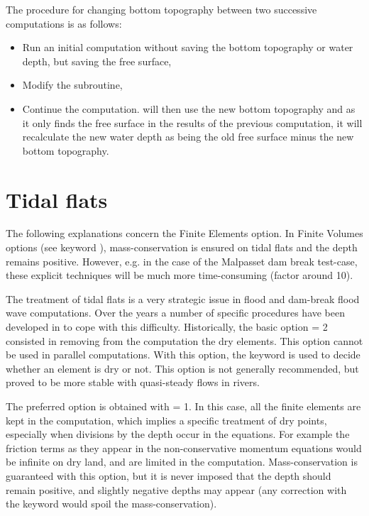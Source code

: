 The procedure for changing bottom topography between two successive computations
is as follows:
\begin{itemize}
\item Run an initial computation without saving the bottom topography or water
depth, but saving the free surface,

\item Modify the  subroutine,

\item Continue the computation.
 will then use the new bottom topography and as it only finds the
free surface in the results of the previous computation, it will recalculate the
new water depth as being the old free surface minus the new bottom topography.

\end{itemize}


\section{Tidal flats}

The following explanations concern the Finite Elements option.
In Finite Volumes options (see keyword ), mass-conservation is
ensured on tidal flats and the depth remains positive.
However, e.g. in the case of the Malpasset dam break test-case, these explicit
techniques will be much more time-consuming (factor around 10).

The treatment of tidal flats is a very strategic issue in flood and dam-break
flood wave computations.
Over the years a number of specific procedures have been developed in
 to cope with this difficulty.
Historically, the basic option  = 2
consisted in removing from the computation the dry elements.
This option cannot be used in parallel computations.
With this option, the keyword  is used to decide
whether an element is dry or not.
This option is not generally recommended, but proved to be more stable with
quasi-steady flows in rivers.

The preferred option is obtained with  = 1.
In this case, all the finite elements are kept in the computation,
which implies a specific treatment of dry points, especially when divisions
by the depth occur in the equations.
For example the friction terms as they appear in the non-conservative momentum
equations would be infinite on dry land, and are limited in the computation.
Mass-conservation is guaranteed with this option, but it is never imposed
that the depth should remain positive, and slightly negative depths may appear
(any correction with the keyword  would spoil the
mass-conservation).

